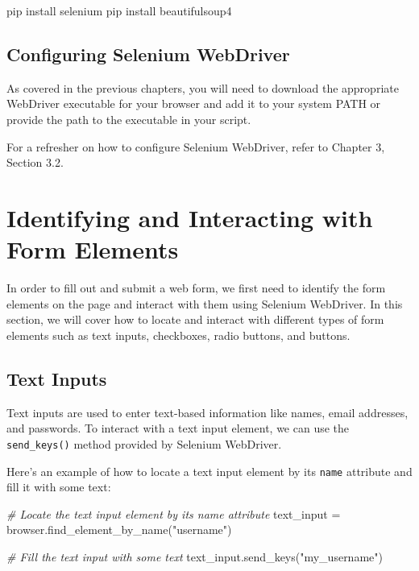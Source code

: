 \documentclass[
  paper=a4,
  ,captions=tableheading
]{scrartcl}
\newenvironment{Shaded}{}{}
\newcommand{\CommentTok}[1]{\textcolor[rgb]{0.38,0.63,0.69}{\textit{#1}}}
\newcommand{\ExtensionTok}[1]{#1}
\newcommand{\NormalTok}[1]{#1}
\newcommand{\OperatorTok}[1]{\textcolor[rgb]{0.40,0.40,0.40}{#1}}
\newcommand{\StringTok}[1]{\textcolor[rgb]{0.25,0.44,0.63}{#1}}
\begin{document}
\begin{Shaded}
\begin{Highlighting}[]
\ExtensionTok{pip}\NormalTok{ install selenium}
\ExtensionTok{pip}\NormalTok{ install beautifulsoup4}
\end{Highlighting}
\end{Shaded}

\hypertarget{configuring-selenium-webdriver}{%
\subsection{Configuring Selenium
WebDriver}\label{configuring-selenium-webdriver}}

As covered in the previous chapters, you will need to download the
appropriate WebDriver executable for your browser and add it to your
system PATH or provide the path to the executable in your script.

For a refresher on how to configure Selenium WebDriver, refer to Chapter
3, Section 3.2.

\hypertarget{identifying-and-interacting-with-form-elements}{%
\section{Identifying and Interacting with Form
Elements}\label{identifying-and-interacting-with-form-elements}}

In order to fill out and submit a web form, we first need to identify
the form elements on the page and interact with them using Selenium
WebDriver. In this section, we will cover how to locate and interact
with different types of form elements such as text inputs, checkboxes,
radio buttons, and buttons.

\hypertarget{text-inputs}{%
\subsection{Text Inputs}\label{text-inputs}}

Text inputs are used to enter text-based information like names, email
addresses, and passwords. To interact with a text input element, we can
use the \texttt{send\_keys()} method provided by Selenium WebDriver.

Here's an example of how to locate a text input element by its
\texttt{name} attribute and fill it with some text:

\begin{Shaded}
\begin{Highlighting}[]
\CommentTok{\# Locate the text input element by its \textquotesingle{}name\textquotesingle{} attribute}
\NormalTok{text\_input }\OperatorTok{=}\NormalTok{ browser.find\_element\_by\_name(}\StringTok{"username"}\NormalTok{)}

\CommentTok{\# Fill the text input with some text}
\NormalTok{text\_input.send\_keys(}\StringTok{"my\_username"}\NormalTok{)}
\end{Highlighting}
\end{Shaded}
\end{document}
